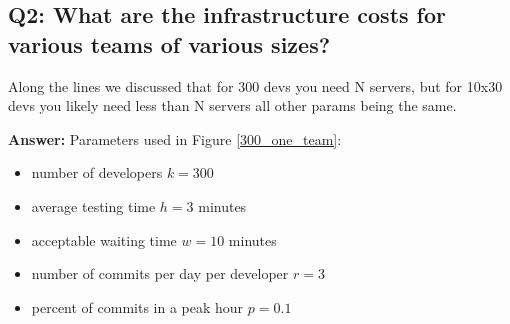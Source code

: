 \documentclass[a4paper]{article}
\begin{document}
\subsection{Q2: What are the infrastructure costs for various teams of various sizes?}
Along the lines we discussed that for 300 devs you need N servers, but for 10x30 devs you likely need less than N servers all other params being the same.

\noindent \textbf{Answer:} Parameters used in Figure \ref{300_one_team}:
\begin{itemize}
\item number of developers $k = 300$
\item average testing time $h = 3$ minutes
\item acceptable waiting time $w = 10$ minutes
\item number of commits per day per developer $r = 3$
\item percent of commits in a peak hour $p = 0.1$
\end{itemize}
\end{document}
